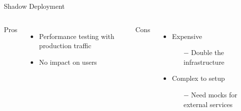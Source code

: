 \documentclass{slide}
\begin{document}
\begin{frame}{Shadow Deployment}
    \vspace{1pt}
    \begin{columns}[t]
      \huge Pros
      {\LARGE
        \begin{itemize}
            \item { Performance testing with production traffic\\}
            \item No impact on users
        \end{itemize}
      }
      \huge Cons
      {\LARGE
        \vspace{3mm}
        \begin{itemize}
            \item Expensive
            \begin{itemize}
                \Large\item[$-$] Double the infrastructure
            \end{itemize}
            \vspace{2mm}
            \item Complex to setup
            \begin{itemize}
                \Large\item[$-$] Need mocks for external services
            \end{itemize}
        \end{itemize}
      }
    \end{columns}
\end{frame}
\end{document}
